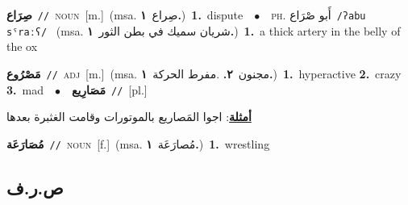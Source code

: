 \documentclass[10pt,a4paper,twoside]{article} %
\begin{document}
\begin{multicols}{2}
{\setlength\topsep{0pt}\textbf{\foreignlanguage{arabic}{صِرَاع}}\ {\color{gray}\texttt{//}\color{black}}\ \textsc{noun}\ [m.]\ \color{gray}(msa. \foreignlanguage{arabic}{صِراع}~\foreignlanguage{arabic}{\textbf{١.}})\color{black}\ \textbf{1.}~dispute\ \ $\bullet$\ \ \textsc{ph.} \color{gray} \foreignlanguage{arabic}{أَبو صْرَاع}\color{black}\ {\color{gray}\texttt{/{\sffamily ʔabu sˤraːʕ}/}\color{black}}\ \color{gray} (msa. \foreignlanguage{arabic}{شريان سميك في بطن الثور}~\foreignlanguage{arabic}{\textbf{١.}})\color{black}\ \textbf{1.}~a thick artery in the belly of the ox\ } \vspace{2mm}

{\setlength\topsep{0pt}\textbf{\foreignlanguage{arabic}{مَصْرُوع}}\ {\color{gray}\texttt{//}\color{black}}\ \textsc{adj}\ [m.]\ \color{gray}(msa. \foreignlanguage{arabic}{مجنون}~\foreignlanguage{arabic}{\textbf{٢.}}  .\foreignlanguage{arabic}{مفرط الحركة}~\foreignlanguage{arabic}{\textbf{١.}})\color{black}\ \textbf{1.}~hyperactive  \textbf{2.}~crazy  \textbf{3.}~mad\ \ $\bullet$\ \ \setlength\topsep{0pt}\textbf{\foreignlanguage{arabic}{مَصَارِيع}}\ {\color{gray}\texttt{//}\color{black}}\ [pl.]\  \begin{flushright}\color{gray}\foreignlanguage{arabic}{\textbf{\underline{\foreignlanguage{arabic}{أمثلة}}}: اجوا المَصاريع بالموتورات وقامت الغثبرة بعدها}\end{flushright}\color{black}} \vspace{2mm}

{\setlength\topsep{0pt}\textbf{\foreignlanguage{arabic}{مُصَارَعَة}}\ {\color{gray}\texttt{//}\color{black}}\ \textsc{noun}\ [f.]\ \color{gray}(msa. \foreignlanguage{arabic}{مُصارَعَة}~\foreignlanguage{arabic}{\textbf{١.}})\color{black}\ \textbf{1.}~wrestling\ } \vspace{2mm}

\vspace{-3mm}
\subsection*{\color{blue}\foreignlanguage{arabic}{ص.ر.ف}\color{blue}{}} 


\end{multicols}
\end{document}
